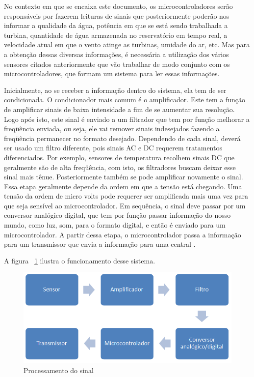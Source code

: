 \begin{enumerate}
	No contexto em que se encaixa este documento, os microcontroladores serão responsáveis por fazerem leituras de sinais 
	que posteriormente poderão nos informar a qualidade da água, potência em que se está sendo trabalhada a turbina,
	quantidade de água armazenada no reservatório em tempo real, a velocidade atual em que o vento atinge as turbinas,
	umidade do ar, etc. Mas para a obtenção dessas diversas informações, é necessária a utilização dos vários sensores
	citados anteriormente que vão trabalhar de modo conjunto com os microcontroladores, que formam um sistema para ler
	essas informações.
	
	Inicialmente, ao se receber a informação dentro do sistema, ela tem de ser condicionada. O condicionador mais comum é
	o amplificador. Este tem a função de amplificar sinais de baixa intensidade a fim de se aumentar sua resolução. Logo
	após isto, este sinal é enviado a um filtrador que tem por função melhorar a freqüência enviada, ou seja, ele vai
	remover sinais indesejados fazendo a freqüência permanecer no formato desejado. Dependendo de cada sinal, deverá ser
	usado um filtro diferente, pois sinais AC e DC requerem tratamentos diferenciados. Por exemplo, sensores de temperatura 
	recolhem sinais DC que geralmente são de alta freqüência, com isto, os filtradores buscam deixar esse sinal mais tênue.
	Posteriormente também se pode amplificar novamente o sinal. Essa etapa geralmente depende da ordem em que a tensão está
	chegando. Uma tensão da ordem de micro volts pode requerer ser amplificada mais uma vez para que seja sensível ao
	microcontrolador. Em sequência, o sinal deve passar por um conversor analógico digital, que tem por função passar
	informação do nosso mundo, como luz, som, para o formato digital, e então é enviado para um microcontrolador. A partir
	dessa etapa, o microcontrolador passa a informação para um transmissor que envia a informação para uma central \footnotemark.
	
	
	A figura ~\ref{funcionamento_microcontrolador} ilustra o funcionamento desse sistema.
	
	\begin{figure}[!h]
	  \centering
	  \includegraphics[scale=0.6]{editaveis/figuras/funcionamento_microcontrolador}
	  \caption[Processamento do sinal]{Processamento do sinal}
	  \FloatBarrier
	  \label{funcionamento_microcontrolador}
	\end{figure}
	
  \end{enumerate}
  
  \vfill